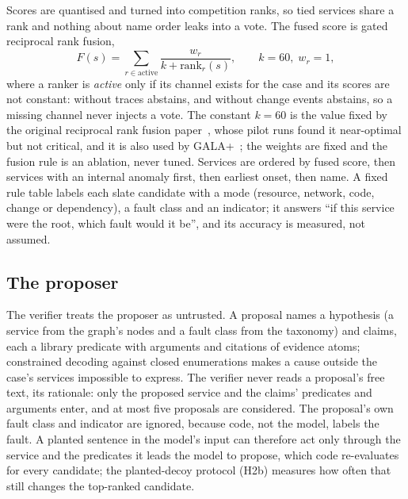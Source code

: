 Scores are quantised and turned into competition ranks, so tied services share a rank and nothing about name order leaks into a vote.
The fused score is gated reciprocal rank fusion,
\begin{equation}
F(s) = \sum_{r \in \text{active}} \frac{w_r}{k + \text{rank}_r(s)}, \qquad k = 60,\; w_r = 1,
\end{equation}
where a ranker is \emph{active} only if its channel exists for the case and its scores are not constant: without traces  abstains, and without change events  abstains, so a missing channel never injects a vote.
The constant $k=60$ is the value fixed by the original reciprocal rank fusion paper~\cite{cormack2009rrf}, whose pilot runs found it near-optimal but not critical, and it is also used by GALA+~\cite{galaplus2026}; the weights are fixed and the fusion rule is an ablation, never tuned.
Services are ordered by fused score, then services with an internal anomaly first, then earliest onset, then name.
A fixed rule table labels each slate candidate with a mode (resource, network, code, change or dependency), a fault class and an indicator; it answers ``if this service were the root, which fault would it be'', and its accuracy is measured, not assumed.

\subsection{The proposer}
\label{sec:proposer}

The verifier treats the proposer as untrusted.
A proposal names a hypothesis (a service from the graph's nodes and a fault class from the taxonomy) and claims, each a library predicate with arguments and citations of evidence atoms; constrained decoding against closed enumerations makes a cause outside the case's services impossible to express.
The verifier never reads a proposal's free text, its rationale: only the proposed service and the claims' predicates and arguments enter, and at most five proposals are considered.
The proposal's own fault class and indicator are ignored, because code, not the model, labels the fault.
A planted sentence in the model's input can therefore act only through the service and the predicates it leads the model to propose, which code re-evaluates for every candidate; the planted-decoy protocol (H2b) measures how often that still changes the top-ranked candidate.


